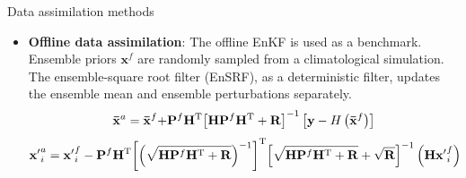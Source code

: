 \documentclass[final]{beamer}
\newlength{\colwidth}
\begin{document}
\begin{frame}[t]
\begin{columns}[t]
\begin{column}{\colwidth}
                \begin{block}{Data assimilation methods}
                    \begin{itemize}
    					\item \textbf{Offline data assimilation}: The offline EnKF \parencite{hakim_last_2016} is used as a benchmark. Ensemble priors $\mathbf{x}^f$ are randomly sampled from a climatological simulation. The ensemble-square root filter (EnSRF), as a deterministic filter, updates the ensemble mean and ensemble perturbations separately.
                        \begin{equation}
                            {{\bf{\bar x}}^a} = {{\bf{\bar x}}^f}{\rm{ + }}{{\bf{P}}^f}{{\bf{H}}^{\rm T}}{\left[ {{\bf{H}}{{\bf{P}}^f}{{\bf{H}}^{\rm T}} + {\bf{R}}} \right]^{ - 1}}\left[ {{\bf{y}} - H\left( {{{{\bf{\bar x}}}^f}} \right)} \right]
                        \end{equation}
                        \begin{equation}
                            {\bf{x'}}_i^a = {\bf{x'}}_i^f - {{\bf{P}}^f}{{\bf{H}}^{\rm T}}{\left[ {{{\left( {\sqrt {{\bf{H}}{{\bf{P}}^f}{{\bf{H}}^{\rm T}} + {\bf{R}}} } \right)}^{ - 1}}} \right]^{\rm T}}{\left[ {\sqrt {{\bf{H}}{{\bf{P}}^f}{{\bf{H}}^{\rm T}} + {\bf{R}}}  + \sqrt {\bf{R}} } \right]^{ - 1}}\left( {{\bf{Hx'}}_i^f} \right)
                        \end{equation}
    

\end{itemize}
\end{block}
\end{column}
\end{columns}
\end{frame}
\end{document}
